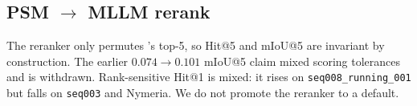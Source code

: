 \subsection{PSM $\to$ MLLM rerank}
\label{sec:results-mllm-rerank}

The reranker only permutes \psm{}'s top-5, so Hit@5 and mIoU@5 are invariant by
construction. The earlier $0.074{\to}0.101$ mIoU@5 claim mixed scoring tolerances
and is withdrawn. Rank-sensitive Hit@1 is mixed: it rises on
\texttt{seq008\_running\_001} but falls on \texttt{seq003} and Nymeria. We do not
promote the reranker to a default.
